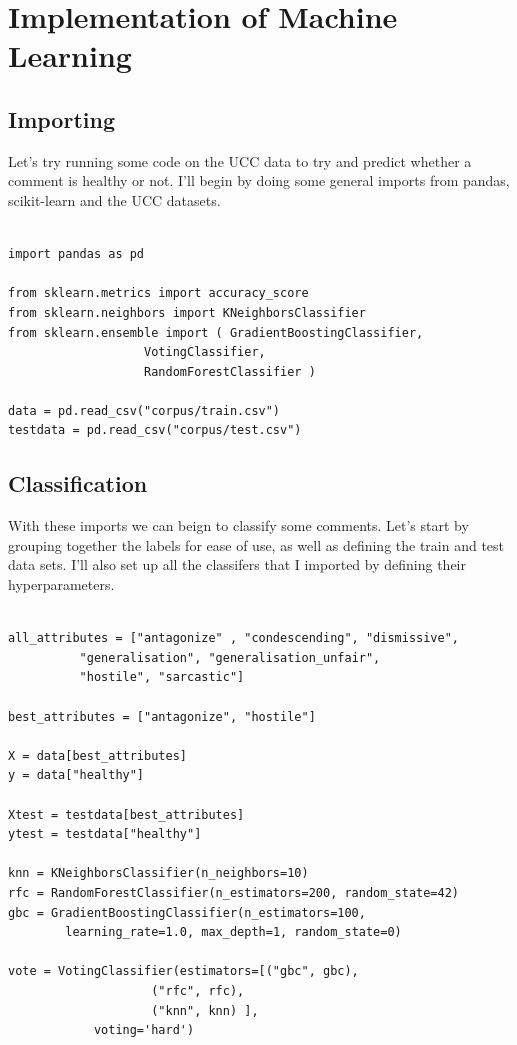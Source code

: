 \documentclass[11pt]{article}
\begin{document}
\section{Implementation of Machine Learning}
\label{sec:orgd9af3eb}

\subsection{Importing}
\label{sec:orgb3c008e}
Let's try running some code on the UCC data to try and predict whether a comment is healthy or not.
I'll begin by doing some general imports from pandas, scikit-learn and the UCC datasets.

\begin{verbatim}

import pandas as pd

from sklearn.metrics import accuracy_score
from sklearn.neighbors import KNeighborsClassifier
from sklearn.ensemble import ( GradientBoostingClassifier, 
			       VotingClassifier, 
			       RandomForestClassifier )

data = pd.read_csv("corpus/train.csv")
testdata = pd.read_csv("corpus/test.csv")

\end{verbatim}


\subsection{Classification}
\label{sec:org0be717c}
With these imports we can beign to classify some comments.
Let's start by grouping together the labels for ease of use, as well as defining the train and test data sets. 
I'll also set up all the classifers that I imported by defining their hyperparameters.

\begin{verbatim}

all_attributes = ["antagonize" , "condescending", "dismissive", 
	      "generalisation", "generalisation_unfair", 
	      "hostile", "sarcastic"]

best_attributes = ["antagonize", "hostile"]

X = data[best_attributes]
y = data["healthy"]

Xtest = testdata[best_attributes]
ytest = testdata["healthy"]

knn = KNeighborsClassifier(n_neighbors=10)
rfc = RandomForestClassifier(n_estimators=200, random_state=42)
gbc = GradientBoostingClassifier(n_estimators=100, 
		learning_rate=1.0, max_depth=1, random_state=0)

vote = VotingClassifier(estimators=[("gbc", gbc), 
				    ("rfc", rfc),
				    ("knn", knn) ], 
			voting='hard')

\end{verbatim}
\end{document}
